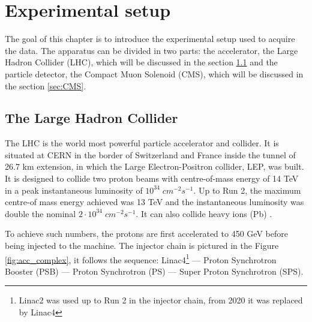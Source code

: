 \chapter{Experimental setup}

The goal of this chapter is to introduce the experimental setup used to acquire the data. The apparatus can be divided in two parts: the accelerator, the Large Hadron Collider (LHC), which will be discussed in the section \ref{sec:LHC} and the particle detector, the Compact Muon Solenoid (CMS), which will be discussed in the section \ref{sec:CMS}.

\section{The Large Hadron Collider}\label{sec:LHC}

The LHC is the world most powerful particle accelerator and collider. It is  situated at CERN in the border of Switzerland and France inside the tunnel of 26.7 km extension, in which the Large Electron-Positron collider, LEP, was built. It is designed to collide two proton beams with centre-of-mass energy of 14 TeV in a peak instantaneous luminosity of $10^{34} \; cm^{-2} s^{-1}$. Up to Run 2, the maximum centre-of mass energy achieved was 13 TeV and the instantaneous luminosity was double the nominal $2 \cdot 10^{34} \; cm^{-2} s^{-1}$. It can also collide heavy ions (Pb) \cite{Evans_2008}.

To achieve such numbers, the protons are first accelerated to 450 GeV before being injected to the machine. The injector chain is pictured in the Figure \ref{fig:acc_complex}, it follows the sequence: Linac4\footnote{Linac2 was used up to Run 2 in the injector chain, from 2020 it was replaced by Linac4} — Proton Synchrotron Booster (PSB) — Proton Synchrotron (PS) — Super Proton Synchrotron (SPS). 

